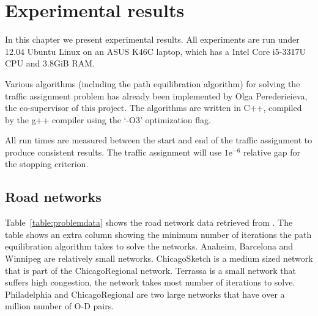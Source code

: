 \chapter{Experimental results}\label{chap:results}

In this chapter we present experimental results.
All experiments are run under 12.04 Ubuntu Linux on an ASUS K46C laptop,
which has a Intel Core i5-3317U CPU and 3.8GiB RAM.

Various algorithms (including the path equilibration algorithm) for solving
the traffic assignment problem has already been implemented by Olga Perederieieva, the co-supervisor of this project.
The algorithms are written in C++, compiled by the g++ compiler using the `-O3' optimization flag.

All run times are measured between the start and end of the traffic assignment
to produce consistent results.
The traffic assignment will use $1\text{e}^{-6}$ relative gap for the stopping criterion.

\section{Road networks}

Table~\ref{table:problemdata} shows the road network data retrieved from \citet{ProblemData}.
The table shows an extra column showing the minimum number of iterations the path equilibration algorithm takes to solve the networks.
Anaheim, Barcelona and Winnipeg are relatively small networks.
ChicagoSketch is a medium sized network that is part of the ChicagoRegional network.
Terrassa is a small network that suffers high congestion, the network takes most number of iterations to solve.
Philadelphia and ChicagoRegional are two large networks that have over a million number of O-D pairs.

